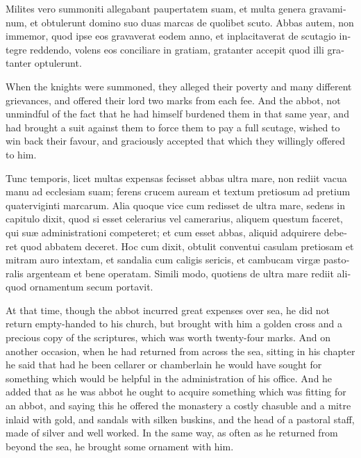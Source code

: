 \documentclass{book}
\begin{document}
\begin{paracol}{2}
\switchcolumn*

\begin{otherlanguage}{latin}
Milites vero summoniti allegabant paupertatem suam, et multa genera gravaminum, et obtulerunt domino suo duas marcas de quolibet scuto. Abbas autem, non immemor, quod ipse eos gravaverat eodem anno, et inplacitaverat de scutagio integre reddendo, volens eos conciliare in gratiam, gratanter accepit quod illi gratanter optulerunt. 
\end{otherlanguage}

\switchcolumn

When the knights were summoned, they alleged their poverty and many different grievances, and offered their lord two marks from each fee. And the abbot, not unmindful of the fact that he had himself burdened them in that same year, and had brought a suit against them to force them to pay a full scutage, wished to win back their favour, and graciously accepted that which they willingly offered to him.

\switchcolumn*

\begin{otherlanguage}{latin}
Tunc temporis, licet multas expensas fecisset abbas ultra mare, non rediit vacua manu ad ecclesiam suam; ferens crucem auream et textum pretiosum ad pretium quaterviginti marcarum. Alia quoque vice cum redisset de ultra mare, sedens in capitulo dixit, quod si esset celerarius vel camerarius, aliquem questum faceret, qui su\ae{} administrationi competeret; et cum esset abbas, aliquid adquirere deberet quod abbatem deceret. Hoc cum dixit, obtulit conventui casulam pretiosam et mitram auro intextam, et sandalia cum caligis sericis, et cambucam virg\ae{} pastoralis argenteam et bene operatam. Simili modo, quotiens de ultra mare rediit aliquod ornamentum secum portavit.
\end{otherlanguage}

\switchcolumn

At that time, though the abbot incurred great expenses over sea, he did not return empty-handed to his church, but brought with him a golden cross and a precious copy of the scriptures, which was worth twenty-four marks. And on another occasion, when he had returned from across the sea, sitting in his chapter he said that had he been cellarer or chamberlain he would have sought for something which would be helpful in the administration of his office. And he added that as he was abbot he ought to acquire something which was fitting for an abbot, and saying this he offered the monastery a costly chasuble and a mitre inlaid with gold, and sandals with silken buskins, and the head of a pastoral staff, made of silver and well worked. In the same way, as often as he returned from beyond the sea, he brought some ornament with him.


\end{paracol}
\end{document}
